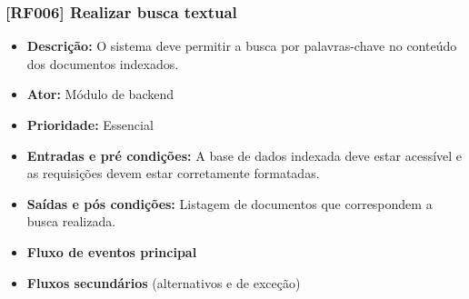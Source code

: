 \subsubsection{[RF006] Realizar busca textual}
\begin{itemize}
   \item \textbf{Descrição:} O sistema deve permitir a busca por palavras-chave no conteúdo dos documentos indexados.
   \item \textbf{Ator:} Módulo de backend
   \item \textbf{Prioridade:} Essencial
   \item \textbf{Entradas e pré condições:} A base de dados indexada deve estar acessível e as requisições devem estar corretamente formatadas.
   \item \textbf{Saídas e pós condições:} Listagem de documentos que correspondem a busca realizada.
   \item \textbf{Fluxo de eventos principal}
   \item \textbf{Fluxos secundários} (alternativos e de exceção)
 \end{itemize}


